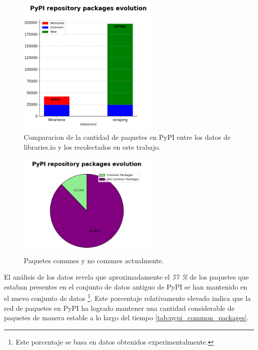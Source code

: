 \begin{figure}[h!]
    \begin{center}
        \includegraphics[width=0.6\textwidth]{img/pypi/bar_common_packages.png}
        \caption{Comparacion de la cantidad de paquetes en PyPI entre los datos de libraries.io y los recolectados en este trabajo.}
        \label{fig:pipy_common_packages_bar}
    \end{center}
\end{figure}

\begin{figure}[h!]
    \begin{center}
        \includegraphics[width=0.6\textwidth]{img/pypi/circ_common_packages.png}
        \caption{Paquetes comunes y no comunes actualmente.}
        \label{fig:pipy_common_packages_circle}
    \end{center}
\end{figure}

El análisis de los datos revela que aproximadamente el \textit{57 \%} de los paquetes que estaban
presentes en el conjunto de datos antiguo de PyPI se han mantenido en el nuevo conjunto de datos
\footnote{Este porcentaje se basa en datos obtenidos experimentalmente.}. Este porcentaje
relativamente elevado indica que la red de paquetes en PyPI ha logrado mantener una cantidad considerable
de paquetes de manera estable a lo largo del tiempo \ref{tab:pypi_common_packages}.

